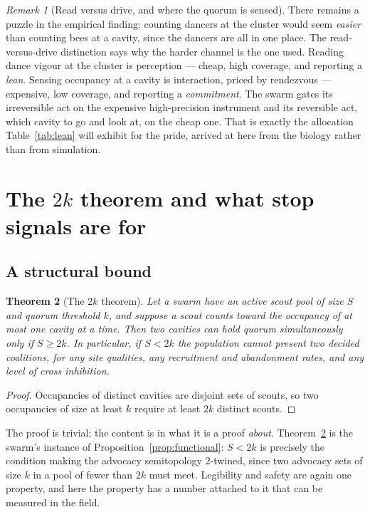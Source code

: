 \documentclass[11pt,a4paper]{article}
\theoremstyle{plain}
\newtheorem{theorem}{Theorem}
\theoremstyle{definition}
\theoremstyle{remark}
\newtheorem{remark}[theorem]{Remark}
\begin{document}
\begin{remark}[Read versus drive, and where the quorum is sensed]
\label{rem:whyatsite}
There remains a puzzle in the empirical finding: counting dancers at the
cluster would seem \emph{easier} than counting bees at a cavity, since the
dancers are all in one place. The read-versus-drive distinction
\cite[\S5.1]{game} says why the harder channel is the one used. Reading dance
vigour at the cluster is perception --- cheap, high coverage, and reporting a
\emph{lean}. Sensing occupancy at a cavity is interaction, priced by rendezvous
--- expensive, low coverage, and reporting a \emph{commitment}. The swarm gates
its irreversible act on the expensive high-precision instrument and its
reversible act, which cavity to go and look at, on the cheap one. That is
exactly the allocation Table~\ref{tab:lean} will exhibit for the pride, arrived
at here from the biology rather than from simulation.
\end{remark}

\section{The $2k$ theorem and what stop signals are for}\label{sec:twok}

\subsection{A structural bound}

\begin{theorem}[The $2k$ theorem]\label{thm:twok}
Let a swarm have an active scout pool of size $S$ and quorum threshold $k$, and
suppose a scout counts toward the occupancy of at most one cavity at a time.
Then two cavities can hold quorum simultaneously only if $S \ge 2k$. In
particular, if $S < 2k$ the population cannot present two decided coalitions,
for any site qualities, any recruitment and abandonment rates, and any level of
cross inhibition.
\end{theorem}

\begin{proof}
Occupancies of distinct cavities are disjoint sets of scouts, so two
occupancies of size at least $k$ require at least $2k$ distinct scouts.
\end{proof}

The proof is trivial; the content is in what it is a proof \emph{about}.
Theorem~\ref{thm:twok} is the swarm's instance of
Proposition~\ref{prop:functional}: $S < 2k$ is precisely the condition making
the advocacy semitopology $2$-twined, since two advocacy sets of size $k$ in a
pool of fewer than $2k$ must meet. Legibility and safety are again one
property, and here the property has a number attached to it that can be
measured in the field.
\end{document}
